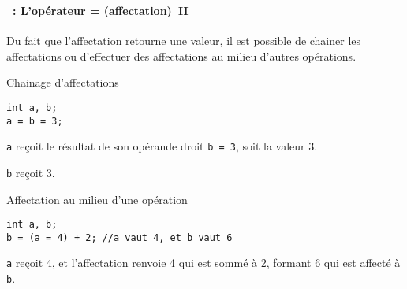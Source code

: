 \begin{frame}[containsverbatim]
  \frametitle{\secname}
  \framesubtitle{\subsecname~: L'opérateur = (affectation)~II} 

  Du fait que l'affectation retourne une valeur, il est possible de chainer les affectations ou d'effectuer des affectations au milieu d'autres
  opérations.
  \par
  \vspace{0.3cm}
  {\small\begin{exampleblock}{Chainage d'affectations}
    \begin{verbatim}
int a, b;
a = b = 3;\end{verbatim}
    \verb|a| reçoit le résultat de son opérande droit \verb|b = 3|, soit la valeur 3. 
    \par
    \verb|b| reçoit 3.
  \end{exampleblock}
  \begin{exampleblock}{Affectation au milieu d'une opération}
    \begin{verbatim}
int a, b;
b = (a = 4) + 2; //a vaut 4, et b vaut 6\end{verbatim}    
    \verb|a| reçoit 4, et l'affectation renvoie 4 qui est sommé à 2, formant 6 qui est affecté à \verb|b|.
  \end{exampleblock}}
\end{frame}

